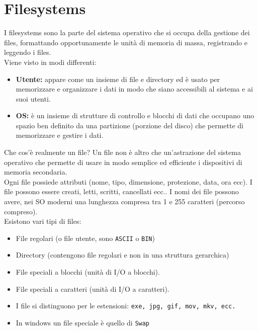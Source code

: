 \documentclass[a4paper]{report}
\begin{document}
\chapter{Filesystems}
I filesystems sono la parte del sistema operativo che si occupa della gestione dei files, formattando opportunamente le unità di memoria di massa, registrando e leggendo i files.\\
Viene visto in modi differenti:
\begin{itemize}
\item \textbf{Utente:} appare come un insieme di file e directory
ed è usato per memorizzare e organizzare i dati in
modo che siano accessibili al sistema e ai suoi
utenti.
\item \textbf{OS:} è un insieme di strutture di controllo e blocchi
di dati che occupano uno spazio ben definito da
una partizione (porzione del disco) che permette di
memorizzare e gestire i dati.
\end{itemize}
Che cos'è realmente un file? Un file non è altro che un'astrazione del sistema operativo che permette di usare in modo semplice ed efficiente i dispositivi di memoria secondaria. \\
Ogni file possiede attributi (nome, tipo, dimensione,
protezione, data, ora ecc).
I file possono essere creati, letti, scritti, cancellati ecc..
I nomi dei file possono avere, nei SO moderni una
lunghezza compresa tra 1 e 255 caratteri (percorso
compreso).\\

Esistono vari tipi di files:
\begin{itemize}
\item File regolari (o file utente, sono \texttt{ASCII} o \texttt{BIN})
\item Directory (contengono file regolari e non in una
struttura gerarchica)
\item File speciali a blocchi (unità di I/O a blocchi).
\item File speciali a caratteri (unità di I/O a caratteri).
\item I file si distinguono per le estensioni: \texttt{exe, jpg, gif,
mov, mkv, ecc.}
\item In windows un file speciale è quello di \texttt{Swap}
\end{itemize}
\end{document}
